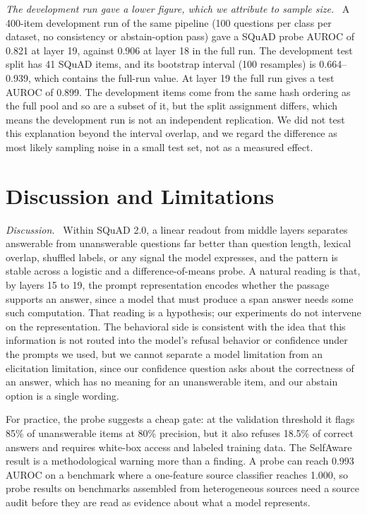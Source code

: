 \documentclass[10pt]{article}
\renewcommand{\paragraph}[1]{\par\vspace{0.3em}\noindent\textit{#1}\ }
\begin{document}
\paragraph{The development run gave a lower figure, which we attribute to sample size.}
A 400-item development run of the same pipeline (100 questions per class per dataset, no consistency or abstain-option pass) gave a SQuAD probe AUROC of 0.821 at layer 19, against 0.906 at layer 18 in the full run. The development test split has 41 SQuAD items, and its bootstrap interval (100 resamples) is 0.664--0.939, which contains the full-run value. At layer 19 the full run gives a test AUROC of 0.899. The development items come from the same hash ordering as the full pool and so are a subset of it, but the split assignment differs, which means the development run is not an independent replication. We did not test this explanation beyond the interval overlap, and we regard the difference as most likely sampling noise in a small test set, not as a measured effect.

\section{Discussion and Limitations}
\paragraph{Discussion.}
Within SQuAD 2.0, a linear readout from middle layers separates answerable from unanswerable questions far better than question length, lexical overlap, shuffled labels, or any signal the model expresses, and the pattern is stable across a logistic and a difference-of-means probe. A natural reading is that, by layers 15 to 19, the prompt representation encodes whether the passage supports an answer, since a model that must produce a span answer needs some such computation. That reading is a hypothesis; our experiments do not intervene on the representation. The behavioral side is consistent with the idea that this information is not routed into the model's refusal behavior or confidence under the prompts we used, but we cannot separate a model limitation from an elicitation limitation, since our confidence question asks about the correctness of an answer, which has no meaning for an unanswerable item, and our abstain option is a single wording.

For practice, the probe suggests a cheap gate: at the validation threshold it flags 85\% of unanswerable items at 80\% precision, but it also refuses 18.5\% of correct answers and requires white-box access and labeled training data. The SelfAware result is a methodological warning more than a finding. A probe can reach 0.993 AUROC on a benchmark where a one-feature source classifier reaches 1.000, so probe results on benchmarks assembled from heterogeneous sources need a source audit before they are read as evidence about what a model represents.
\end{document}

